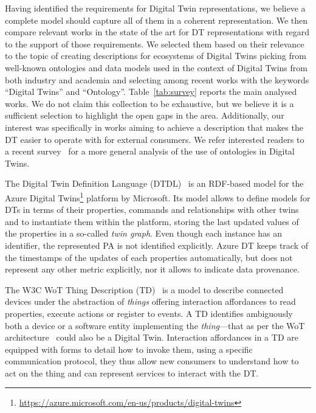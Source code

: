 Having identified the requirements for Digital Twin representations, we believe a complete model should capture all of them in a coherent representation.
%
We then compare relevant works in the state of the art for DT representations with regard to the support of those requirements.
%
We selected them based on their relevance to the topic of creating descriptions for ecosystems of Digital Twins picking from well-known ontologies and data models used in the context of Digital Twins from both industry and academia and selecting among recent works with the keywords ``Digital Twins'' and ``Ontology''. 
%
%
%
Table~\ref{tab:survey} reports the main analysed works.
%
We do not claim this collection to be exhaustive, but we believe it is a sufficient selection to highlight the open gaps in the area. Additionally, our interest was specifically in works aiming to achieve a description that makes the DT easier to operate with for external consumers. We refer interested readers to a recent survey~\cite{karabulut_ontologies_2024} for a more general analysis of the use of ontologies in Digital Twins.

The Digital Twin Definition Language (DTDL)~\cite{dtdl} is an RDF-based model for the Azure Digital Twins\footnote{\url{https://azure.microsoft.com/en-us/products/digital-twins}} platform by Microsoft.
Its model allows to define models for DTs in terms of their properties, commands and relationships with other twins and to instantiate them within the platform, storing the last updated values of the properties in a so-called \emph{twin graph}.
Even though each instance has an identifier, the represented PA is not identified explicitly.
Azure DT keeps track of the timestamps of the updates of each properties automatically, but does not represent any other metric explicitly, nor it allows to indicate data provenance.

The W3C WoT Thing Description (TD)~\cite{wotTD} is a model to describe connected devices under the abstraction of \emph{things} offering interaction affordances to read properties, execute actions or register to events. A TD identifies ambiguously both a device or a software entity implementing the \emph{thing}---that as per the WoT architecture~\cite{Matsukura:23:WTA} could also be a Digital Twin. Interaction affordances in a TD are equipped with forms to detail how to invoke them, using a specific communication protocol, they thus allow new consumers to understand how to act on the thing and can represent services to interact with the DT.


